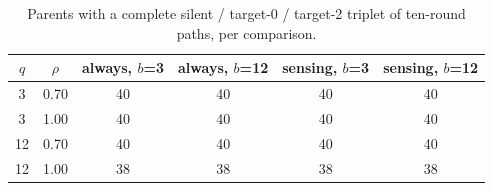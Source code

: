 \begin{table}[htbp]
\centering
\small
\caption{Parents with a complete silent / target-0 / target-2 triplet of ten-round paths, per comparison.}\label{tab:sample}
\begin{tabular}{cc cccc}
\toprule
$q$ & $\rho$ & always, $b$=3 & always, $b$=12 & sensing, $b$=3 & sensing, $b$=12 \\
\midrule
3 & 0.70 & 40 & 40 & 40 & 40 \\
3 & 1.00 & 40 & 40 & 40 & 40 \\
12 & 0.70 & 40 & 40 & 40 & 40 \\
12 & 1.00 & 38 & 38 & 38 & 38 \\
\bottomrule
\end{tabular}
\end{table}